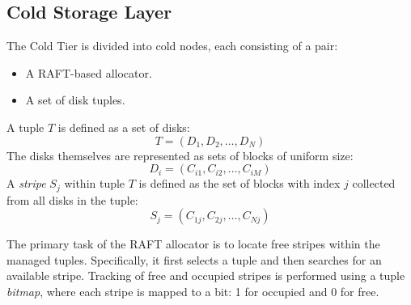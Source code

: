 \documentclass[a4paper,12pt]{article}
\begin{document}
    \subsection{Cold Storage Layer}

    The Cold Tier is divided into cold nodes, each consisting of a pair:
    \begin{itemize}
        \item A RAFT-based allocator.
        \item A set of disk tuples.
    \end{itemize}

    A tuple $T$ is defined as a set of disks:
    \[T=\left( D_1, D_2, \dots, D_N \right)\]
    The disks themselves are represented as sets of blocks of uniform size:
    \[D_i = \left( C_{i1}, C_{i2}, \dots, C_{iM} \right)\]
    A \textit{stripe} $S_j$ within tuple $T$ is defined as the set of blocks with index $j$ collected from all disks in the tuple:
    \[S_j = \left( C_{1j}, C_{2j}, \dots, C_{Nj} \right)\]

    The primary task of the RAFT allocator is to locate free stripes within the managed tuples. Specifically, it first selects a tuple and then searches for an available stripe. Tracking of free and occupied stripes is performed using a tuple \textit{bitmap}, where each stripe is mapped to a bit: 1 for occupied and 0 for free.
\end{document}
